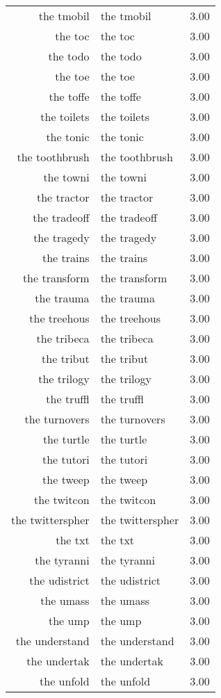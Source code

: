 \begin{table}[ht]
\begin{tabular}{rlr}
  the tmobil & the tmobil & 3.00 \\ 
  the toc & the toc & 3.00 \\ 
  the todo & the todo & 3.00 \\ 
  the toe & the toe & 3.00 \\ 
  the toffe & the toffe & 3.00 \\ 
  the toilets & the toilets & 3.00 \\ 
  the tonic & the tonic & 3.00 \\ 
  the toothbrush & the toothbrush & 3.00 \\ 
  the towni & the towni & 3.00 \\ 
  the tractor & the tractor & 3.00 \\ 
  the tradeoff & the tradeoff & 3.00 \\ 
  the tragedy & the tragedy & 3.00 \\ 
  the trains & the trains & 3.00 \\ 
  the transform & the transform & 3.00 \\ 
  the trauma & the trauma & 3.00 \\ 
  the treehous & the treehous & 3.00 \\ 
  the tribeca & the tribeca & 3.00 \\ 
  the tribut & the tribut & 3.00 \\ 
  the trilogy & the trilogy & 3.00 \\ 
  the truffl & the truffl & 3.00 \\ 
  the turnovers & the turnovers & 3.00 \\ 
  the turtle & the turtle & 3.00 \\ 
  the tutori & the tutori & 3.00 \\ 
  the tweep & the tweep & 3.00 \\ 
  the twitcon & the twitcon & 3.00 \\ 
  the twitterspher & the twitterspher & 3.00 \\ 
  the txt & the txt & 3.00 \\ 
  the tyranni & the tyranni & 3.00 \\ 
  the udistrict & the udistrict & 3.00 \\ 
  the umass & the umass & 3.00 \\ 
  the ump & the ump & 3.00 \\ 
  the understand & the understand & 3.00 \\ 
  the undertak & the undertak & 3.00 \\ 
  the unfold & the unfold & 3.00 \\ 

\end{tabular}
\end{table}
